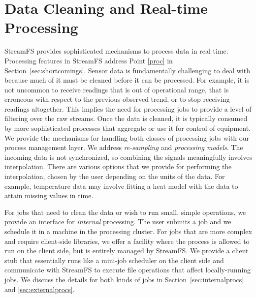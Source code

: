 \section{Data Cleaning and Real-time Processing}

StreamFS provides sophisticated mechanisms to process data in real time.  Processing features in StreamFS address
Point \ref{proc} in Section~\ref{sec:shortcomings}.
Sensor data is fundamentally challenging to deal with because much of it must be cleaned before it can be processed.  For example,
it is not uncommon to receive readings that is out of operational range, that is erroneous with respect to the previous observed trend,
or to stop receiving readings altogether.  This implies the need for processing jobs to provide a level of filtering over the raw streams.
Once the data is cleaned, it is typically consumed by more sophisticated processes that aggregate or use it for control
of equipment.  We provide the mechanisms for handling both classes of processing jobs with our process management layer.
We address \emph{re-sampling} and \emph{processing models}.  The incoming data is not synchronized, 
so combining the signals meaningfully involves interpolation.  There are various options that we
provide for performing the interpolation, chosen by the user depending on the units of the data.  For example,
temperature data may involve fitting a heat model with the data to attain missing values in time.  

For jobs that need to clean the data or wish to run small, simple operations, we provide an interface for
\emph{internal} processing.  The user submits a job and we schedule it in a machine in the processing cluster.
For jobs that are more complex and require client-side libraries, we offer a facility where the process is allowed
to run on the client side, but is entirely managed by StreamFS.  We provide a client stub that essentially runs like a
mini-job scheduler on the client side and communicate with StreamFS to execute file operations that affect locally-running
jobs.  We discuss the details for both kinds of jobs in Section~\ref{sec:internalprocs} and \ref{sec:externalprocs}.


